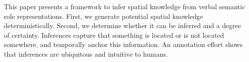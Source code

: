 This paper presents a framework to infer spatial knowledge from verbal semantic role representations. First, we generate potential spatial knowledge deterministically. Second, we determine whether it can be inferred and a degree of certainty. Inferences capture that something is located or is not located somewhere, and temporally anchor this information. An annotation effort shows that inferences are ubiquitous and intuitive to humans.
